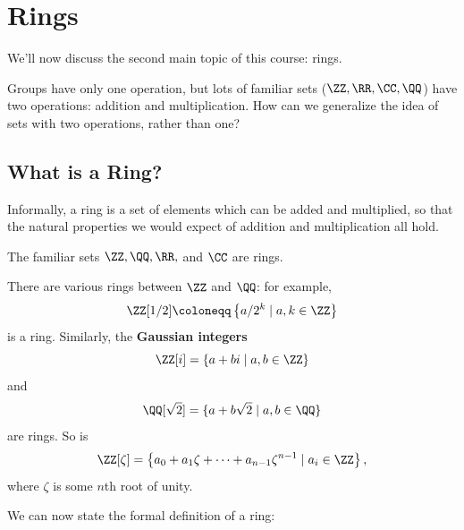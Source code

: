

\section{Rings}

We'll now discuss the second main topic of this course: rings.

\begin{qq}
Groups have only one operation, but lots of familiar sets ($\ZZ, \RR, \CC, \QQ$) have two operations: addition and multiplication. How can we generalize the idea of sets with two operations, rather than one?
\end{qq}

\subsection{What is a Ring?}

Informally, a ring is a set of elements which can be added and multiplied, so that the natural properties we would expect of addition and multiplication all hold. 

\begin{example}
The familiar sets $\ZZ, \QQ, \RR,$ and $\CC$ are rings. 
\end{example}

\begin{example}
There are various rings between $\ZZ$ and $\QQ$: for example, \[\ZZ[1/2] \coloneqq \left\{a/2^k \mid a, k \in \ZZ\right\}\] is a ring. Similarly, the \textbf{Gaussian integers} \[\ZZ[i] = \{a + bi \mid a, b \in \ZZ\}\] and \[\QQ[\sqrt{2}] = \{a + b\sqrt{2} \mid a, b \in \QQ\}\] are rings. So is \[\ZZ[\zeta] = \left\{a_0 + a_1\zeta + \cdots + a_{n - 1}\zeta^{n - 1} \mid a_i \in \ZZ\right\},\] where $\zeta$ is some $n$th root of unity. 
\end{example}

We can now state the formal definition of a ring:

